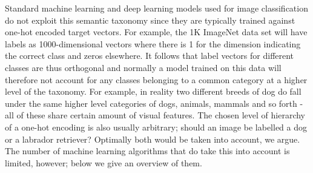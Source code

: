 \documentclass[12pt]{report}
\begin{document}
Standard machine learning and deep learning models used for image classification do not exploit this semantic taxonomy since they are typically trained against one-hot encoded target vectors. For example, the 1K ImageNet data set \cite{JiaDeng2009} will have labels as 1000-dimensional vectors where there is 1 for the dimension indicating the correct class and zeros elsewhere. It follows that label vectors for different classes are thus orthogonal and normally a model trained on this data will therefore not account for any classes belonging to a common category at a higher level of the taxonomy. For example, in reality two different breeds of dog do fall under the same higher level categories of dogs, animals, mammals and so forth - all of these share certain amount of visual features. The chosen level of hierarchy of a one-hot encoding is also usually arbitrary; should an image be labelled a dog or a labrador retriever? Optimally both would be taken into account, we argue. The number of machine learning algorithms that do take this into account is limited, however; below we give an overview of them.
\end{document}
